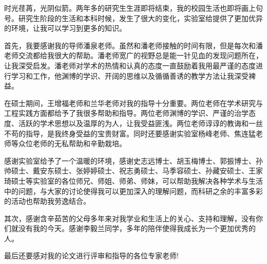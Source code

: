 ﻿%

时光荏苒，光阴似箭。两年多的研究生生涯即将结束，我的校园生活也即将画上句号。研究生阶段的生活和本科时候，发生了很大的变化，实验室给提供了更加优异的环境，让我可以学习到更多的知识。

首先，我要感谢我的导师潘泉老师。虽然和潘老师接触的时间有限，但是每次和潘老师交流都给我很大的帮助。潘老师宽广的视野总是能一针见血的发现问题所在，让我深受启发。潘老师对学术的热情和认真的态度一直鼓励着我用最严谨的态度进行学习和工作，他渊博的学识、开阔的思维以及循循善诱的教学方法让我深受裨益。

在硕士期间，王增福老师和兰华老师对我的指导十分重要。两位老师在学术研究与工程实践方面都给予了我很多帮助和指导。两位老师渊博的学识、严谨的治学态度、活跃的学术思想以及温厚的为人，让我受益匪浅。两位老师谆谆的教诲和一丝不苟的指导，是我终身受益的宝贵财富。同时还要感谢实验室杨峰老师、焦连猛老师等众位老师的无私帮助和辛勤栽培。

感谢实验室给予了一个温暖的环境，感谢史志远博士、胡玉梅博士、郭振博士、孙帅硕士、戴安东硕士、张婷婷硕士、祝志勇硕士、马季容硕士、孙藏安硕士、王家琦硕士等实验室的各位师兄、师姐、师弟、师妹，可以帮助我解决各种学术与生活中的问题，与大家的讨论使得我可以更加深入的理解问题，而科研之余的丰富多彩的活动也帮助我劳逸结合。

其次，感谢含辛茹苦的父母多年来对我学业和生活上的关心、支持和理解，没有你们就没有我的今天。感谢李毅兰同学，多年的陪伴使得我成长为一个更加优秀的人。

最后还要感对我的论文进行评审和指导的各位专家老师!